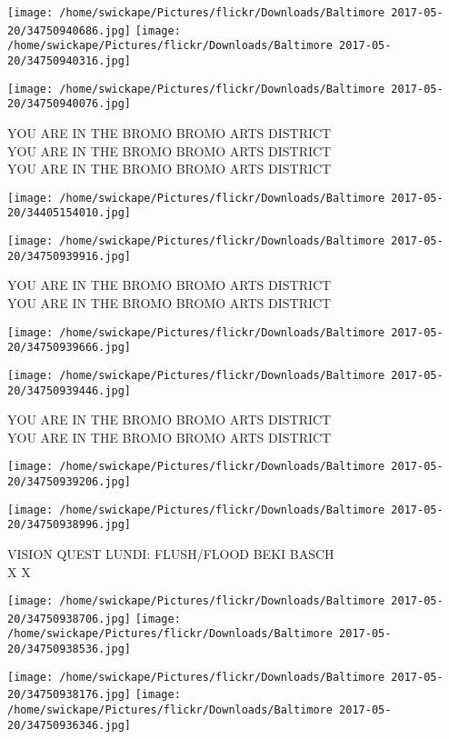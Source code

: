 \documentclass[10pt,letterpaper]{article}
\begin{document}
\texttt{[image: /home/swickape/Pictures/flickr/Downloads/Baltimore 2017-05-20/34750940686.jpg]}
\texttt{[image: /home/swickape/Pictures/flickr/Downloads/Baltimore 2017-05-20/34750940316.jpg]}

\texttt{[image: /home/swickape/Pictures/flickr/Downloads/Baltimore 2017-05-20/34750940076.jpg]}

YOU ARE IN THE BROMO BROMO ARTS DISTRICT\\
YOU ARE IN THE BROMO BROMO ARTS DISTRICT\\
YOU ARE IN THE BROMO BROMO ARTS DISTRICT
\pagebreak

\texttt{[image: /home/swickape/Pictures/flickr/Downloads/Baltimore 2017-05-20/34405154010.jpg]}

\vspace{0.25in}
\texttt{[image: /home/swickape/Pictures/flickr/Downloads/Baltimore 2017-05-20/34750939916.jpg]}

YOU ARE IN THE BROMO BROMO ARTS DISTRICT\\
YOU ARE IN THE BROMO BROMO ARTS DISTRICT
\pagebreak

\texttt{[image: /home/swickape/Pictures/flickr/Downloads/Baltimore 2017-05-20/34750939666.jpg]}

\vspace{0.25in}
\texttt{[image: /home/swickape/Pictures/flickr/Downloads/Baltimore 2017-05-20/34750939446.jpg]}

YOU ARE IN THE BROMO BROMO ARTS DISTRICT\\
YOU ARE IN THE BROMO BROMO ARTS DISTRICT
\pagebreak

\texttt{[image: /home/swickape/Pictures/flickr/Downloads/Baltimore 2017-05-20/34750939206.jpg]}

\vspace{0.25in}
\texttt{[image: /home/swickape/Pictures/flickr/Downloads/Baltimore 2017-05-20/34750938996.jpg]}

VISION QUEST LUNDI: FLUSH/FLOOD BEKI BASCH\\
X X
\pagebreak

\texttt{[image: /home/swickape/Pictures/flickr/Downloads/Baltimore 2017-05-20/34750938706.jpg]}
\texttt{[image: /home/swickape/Pictures/flickr/Downloads/Baltimore 2017-05-20/34750938536.jpg]}

\texttt{[image: /home/swickape/Pictures/flickr/Downloads/Baltimore 2017-05-20/34750938176.jpg]}
\texttt{[image: /home/swickape/Pictures/flickr/Downloads/Baltimore 2017-05-20/34750936346.jpg]}
\end{document}

